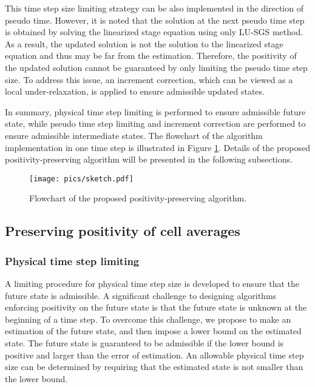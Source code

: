 This time step size limiting strategy can be also implemented in the direction of pseudo time. However, it is noted that the solution at the next pseudo time step is obtained by solving the linearized stage equation using only LU-SGS method. As a result, the updated solution is not the solution to the linearized stage equation and thus may be far from the estimation. Therefore, the positivity of the updated solution cannot be guaranteed by only limiting the pseudo time step size. To address this issue, an increment correction, which can be viewed as a local under-relaxation, is applied to ensure admissible updated states. 


In summary, physical time step limiting is performed to ensure admissible future state, while pseudo time step limiting and increment correction are performed to ensure admissible intermediate states. The flowchart of the algorithm implementation in one time step is illustrated in Figure \ref{fig:sketch}. Details of the proposed positivity-preserving algorithm will be presented in the following subsections.

\begin{figure}[htbp!]
    \centering
    \texttt{[image: pics/sketch.pdf]}
    \caption{Flowchart of the proposed positivity-preserving algorithm.}
    \label{fig:sketch}
\end{figure}

\subsection{Preserving positivity of cell averages}
\subsubsection{Physical time step limiting}
\label{ssec:physical-limiting}
A limiting procedure for physical time step size is developed to ensure that the future state is admissible. A significant challenge to designing algorithms enforcing positivity on the future state is that the future state is unknown at the beginning of a time step. To overcome this challenge, we propose to make an estimation of the future state, and then impose a lower bound on the estimated state. The future state is guaranteed to be admissible if the lower bound is positive and larger than the error of estimation. An allowable physical time step size can be determined by requiring that the estimated state is not smaller than the lower bound. 

